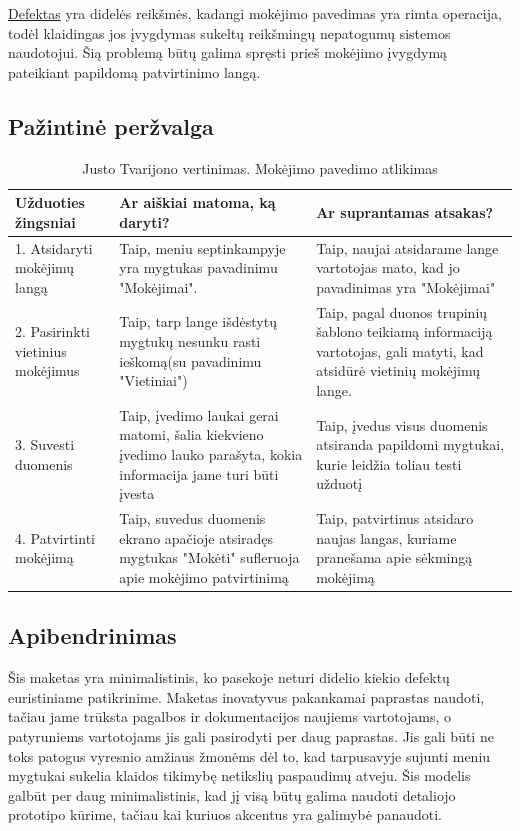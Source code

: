 \documentclass[oneside]{VUMIFPSkursinis}
\begin{document}
\hyperref[lentele:klaiduPrevencijaM]{Defektas} yra didelės reikšmės, kadangi mokėjimo pavedimas yra rimta operacija, todėl klaidingas jos įvygdymas sukeltų reikšmingų nepatogumų sistemos naudotojui. Šią problemą būtų galima spręsti prieš mokėjimo įvygdymą pateikiant papildomą patvirtinimo langą.
\subsection{Pažintinė peržvalga}

\begin{center}
\begin{longtable}[!htb]{|p{5cm}|p{5cm}|p{5cm}|}
	\caption{Justo Tvarijono vertinimas. Mokėjimo pavedimo atlikimas}
\endfirsthead
\endhead
	\hline
	Užduoties žingsniai & Ar aiškiai matoma, ką daryti? & Ar suprantamas atsakas? \\ \hline
	1. Atsidaryti mokėjimų langą & Taip, meniu septinkampyje yra mygtukas pavadinimu "Mokėjimai".  & Taip, naujai atsidarame lange vartotojas mato, kad jo pavadinimas yra "Mokėjimai"  \\ \hline
	2. Pasirinkti vietinius mokėjimus & Taip, tarp lange išdėstytų mygtukų nesunku rasti ieškomą(su pavadinimu "Vietiniai") & Taip, pagal duonos trupinių šablono teikiamą informaciją vartotojas, gali matyti, kad atsidūrė vietinių mokėjimų lange. \\ \hline
	3. Suvesti duomenis & Taip, įvedimo laukai gerai matomi, šalia kiekvieno įvedimo lauko parašyta, kokia informacija jame turi būti įvesta & Taip, įvedus visus duomenis atsiranda papildomi mygtukai, kurie leidžia toliau testi užduotį \\ \hline
	4. Patvirtinti mokėjimą & Taip, suvedus duomenis ekrano apačioje atsiradęs mygtukas "Mokėti" sufleruoja apie mokėjimo patvirtinimą & Taip, patvirtinus atsidaro naujas langas, kuriame pranešama apie sėkmingą mokėjimą \\ \hline
\end{longtable}
\end{center}
\subsection{Apibendrinimas}
Šis maketas yra minimalistinis, ko pasekoje neturi didelio kiekio defektų euristiniame patikrinime. Maketas inovatyvus pakankamai paprastas naudoti, tačiau jame trūksta pagalbos ir dokumentacijos naujiems vartotojams, o patyruniems vartotojams jis gali pasirodyti per daug paprastas. Jis gali būti ne toks patogus vyresnio amžiaus žmonėms dėl to, kad tarpusavyje sujunti meniu mygtukai sukelia klaidos tikimybę netikslių paspaudimų atveju. Šis modelis galbūt per daug minimalistinis, kad jį visą būtų galima naudoti detaliojo prototipo kūrime, tačiau kai kuriuos akcentus yra galimybė panaudoti.
\end{document}

